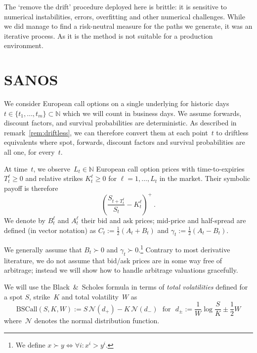 \documentclass[11pt,a4paper]{article}
\newcommand{\N}{\mathbb{N}}
\newcommand{\BSCall}{\mathrm{BSCall}}
\begin{document}
The `remove the drift' procedure deployed here is brittle: it is sensitive to numerical instabilities,
errors, overfitting and other numerical challenges. While we did manage to find a risk-neutral
measure for the paths we generate, it was an iterative process. As it is the method is not suitable
for a production environment.


\section{SANOS}

\label{sec:markets}


We consider European call options on a single underlying
for historic days $t\in \{t_1,\ldots,t_m\}\subset \N$
which we will count in business days.
We assume forwards, discount factors, and survival probabilities
are deterministic. As described in remark~\ref{rem:driftless},
 we can therefore convert them at each point~$t$ to driftless equivalents
where spot, forwards, discount factors and survival probabilities are all one, for every~$t$.


At time~$t$, we observe~$L_t\in\N$
European call option prices with time-to-expiries $T_t^\ell \geq 0$ and
relative strikes $K_t^\ell\geq 0$
for $\ell=1,\ldots,L_t$
in the market. Their symbolic payoff is therefore
$$
   \left(\frac{S_{t+T_t^\ell}}{S_t} - K_t^\ell \right)^+ \ .
$$
We denote by $B_t^{\ell}$ and $A_t^\ell$ their bid and ask prices;
mid-price and half-spread are defined (in vector notation) as
$C_t := \tfrac{1}{2}(A_t + B_t)$ and
$\gamma_t := \tfrac{1}{2}(A_t - B_t)$.

We generally assume that $B_t\succ0$ and $\gamma_t\succ0$.\footnote{
We define $x \succ y \Leftrightarrow \forall i: x^i > y^i$.}
Contrary to most derivative literature, we do not assume that bid/ask prices are in some way free of arbitrage; instead
we will show how to handle arbitrage valuations gracefully.

We will use the Black~\&~Scholes formula in terms of \emph{total volatilities} defined
for a spot $S$, strike~$K$ and total volatility~$W$ as
\begin{equation}\label{eq:bs}
    \BSCall(S,K,W) := S\,\mathcal{N}( d_+ ) - K\,\mathcal{N}(d_-)
    \ \ \ \mbox{for} \ \ \
    d_\pm := \frac{ 1 }{ W } \log \frac S K \pm \frac12 W
\end{equation}
where~$\mathcal{N}$ denotes the normal distribution function.
\end{document}
